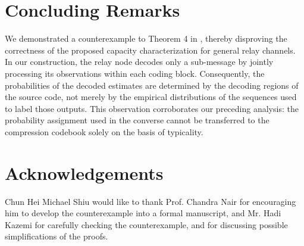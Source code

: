 \documentclass[12pt]{article}
\theoremstyle{definition}
\begin{document}
\section{Concluding Remarks} \label{sec: concluding remarks}

We demonstrated a counterexample to Theorem 4 in \cite{pon26}, thereby disproving the correctness of the proposed capacity characterization for general relay channels. In our construction, the relay node decodes only a sub-message by jointly processing its observations within each coding block. Consequently, the probabilities of the decoded estimates are determined by the decoding regions of the source code, not merely by the empirical distributions of the sequences used to label those outputs. This observation corroborates our preceding analysis: the probability assignment used in the converse cannot be transferred to the compression codebook solely on the basis of typicality.



\section*{Acknowledgements}
Chun Hei Michael Shiu would like to thank Prof. Chandra Nair for encouraging him to develop the counterexample into a formal manuscript, and Mr. Hadi Kazemi for carefully checking the counterexample, and for discussing possible simplifications of the proofs.



\newpage




\end{document}
